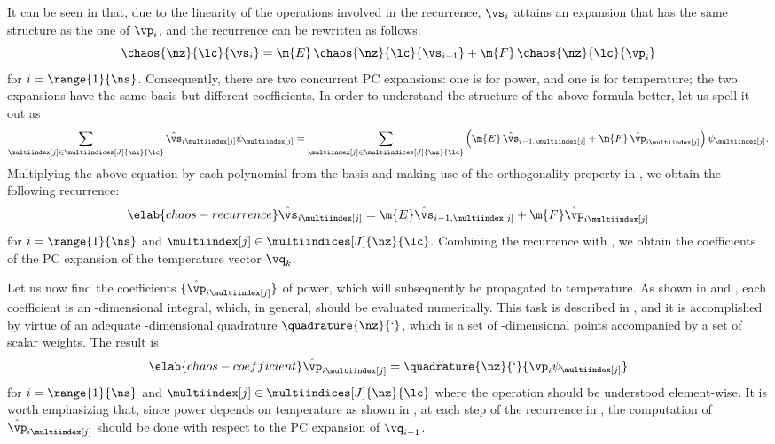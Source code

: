 It can be seen in  that, due to the linearity of
the operations involved in the recurrence, $\vs_i$ attains an expansion that has
the same structure as the one of $\vp_i$, and the recurrence can be rewritten as
follows:
\[
  \chaos{\nz}{\lc}{\vs_i} = \m{E} \, \chaos{\nz}{\lc}{\vs_{i - 1}} + \m{F} \, \chaos{\nz}{\lc}{\vp_i}
\]
for $i = \range{1}{\ns}$. Consequently, there are two concurrent \ac{PC}
expansions: one is for power, and one is for temperature; the two expansions
have the same basis but different coefficients. In order to understand the
structure of the above formula better, let us spell it out as
\[
  \sum_{\multiindex[j] \in \multiindices[J]{\nz}{\lc}} \hat{\vs}_{i \multiindex[j]} \psi_{\multiindex[j]} =
  \sum_{\multiindex[j] \in \multiindices[J]{\nz}{\lc}} \left(\m{E} \, \hat{\vs}_{i - 1, \multiindex[j]} + \m{F} \, \hat{\vp}_{i \multiindex[j]}\right) \psi_{\multiindex[j]}.
\]
Multiplying the above equation by each polynomial from the basis and making use
of the orthogonality property in , we obtain the
following recurrence:
\begin{equation} \elab{chaos-recurrence}
  \hat{\vs}_{i \multiindex[j]} = \m{E} \hat{\vs}_{i - 1, \multiindex[j]} + \m{F} \hat{\vp}_{i \multiindex[j]}
\end{equation}
for $i = \range{1}{\ns}$ and $\multiindex[j] \in \multiindices[J]{\nz}{\lc}$.
Combining the recurrence with , we obtain the
coefficients of the \ac{PC} expansion of the temperature vector $\vq_k$.

Let us now find the coefficients $\{ \hat{\vp}_{i \multiindex[j]} \}$ of power,
which will subsequently be propagated to temperature. As shown in
 and , each coefficient is an
\nz-dimensional integral, which, in general, should be evaluated numerically.
This task is described in , and it is accomplished
by virtue of an adequate \nz-dimensional quadrature $\quadrature{\nz}{\lq}$,
which is a set of \nz-dimensional points accompanied by a set of scalar weights.
The result is
\begin{equation} \elab{chaos-coefficient}
  \hat{\vp}_{i \multiindex[j]} = \quadrature{\nz}{\lq}{\vp_i \psi_{\multiindex[j]}}
\end{equation}
for $i = \range{1}{\ns}$ and $\multiindex[j] \in \multiindices[J]{\nz}{\lc}$
where the operation should be understood element-wise. It is worth emphasizing
that, since power depends on temperature as shown in , at each
step of the recurrence in , the computation of
$\hat{\vp}_{i \multiindex[j]}$ should be done with respect to the \ac{PC}
expansion of $\vq_{i - 1}$.

